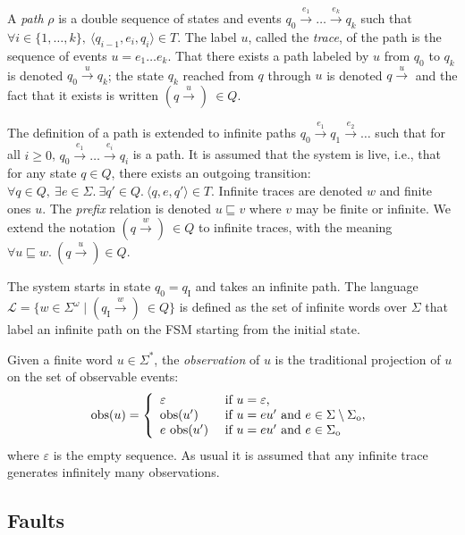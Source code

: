 \documentclass{article}
\newcommand{\prefix}{\sqsubseteq}
\newcommand{\qi}[0]{q_{\mathrm{I}}}
\newcommand{\sigmao}[0]{\Sigma_{\mathrm{o}}}
\newcommand{\Sigmao}[0]{\sigmao}
\newcommand{\path}[0]{\mathit{\rho}}
\newcommand{\trans}[1]{\stackrel{#1}{\rightarrow}}
\newcommand{\lang}[0]{\mathcal{L}}
\newcommand{\obs}[0]{\mathrm{obs}}
\begin{document}
A \emph{path} $\path$ is a double sequence 
of states and events $q_0\trans{e_1}\dots\trans{e_k}q_k$ 
such that $\forall i \in \{1,\dots,k\},\ 
\langle q_{i-1},e_i,q_i\rangle \in T$.  
The label $u$, called the \emph{trace}, of the path 
is the sequence of events $u = e_1\dots e_k$.  
That there exists a path labeled by $u$ from $q_0$ to $q_k$ 
is denoted $q_0 \trans{u} q_k$; 
the state $q_k$ reached from $q$ through $u$ is denoted $q \trans{u}$ 
and the fact that it exists is written $(q \trans{u})\ \in Q$.  

The definition of a path is extended to infinite paths 
$q_0\trans{e_1}q_1\trans{e_2}\dots$ such that for all $i\ge 0$, 
$q_0\trans{e_1}\dots\trans{e_i}q_i$ is a path.  
It is assumed that the system is live, 
i.e., that for any state $q \in Q$, there exists an outgoing transition: 
$\forall q \in Q,\ \exists e \in \Sigma.\ \exists q' \in Q.\ 
\langle q,e,q'\rangle \in T$.  
Infinite traces are denoted $w$ and finite ones $u$.  
The \emph{prefix} relation is denoted $u \prefix v$ 
where $v$ may be finite or infinite.  
We extend the notation $(q \trans{w})\ \in Q$ to infinite traces, 
with the meaning $\forall u \prefix w.\ (q \trans{u}) \in Q$.  

The system starts in state $q_0 = \qi$ 
and takes an infinite path.  
The language $\lang = \{w \in \Sigma^\omega \mid (\qi \trans{w})\ \in Q\}$ 
is defined as the set of infinite words over $\Sigma$ 
that label an infinite path on the FSM starting from the initial state.  

Given a finite word $u \in \Sigma^*$, 
the \emph{observation} of $u$ is the traditional projection 
of $u$ on the set of observable events: 
\begin{displaymath}
\obs(u) = \left\{
\begin{array}{l l}
\varepsilon & \textrm{ if } u = \varepsilon, \\
\obs(u')    & 
\textrm{ if } u = eu' \textrm{ and } e \in \Sigma \setminus \Sigmao, \\
e\ \obs(u')  & 
\textrm{ if } u = eu' \textrm{ and } e \in \Sigmao 
\end{array}
\right.
\end{displaymath}
where $\varepsilon$ is the empty sequence.  
As usual it is assumed that any infinite trace 
generates infinitely many observations.  

\subsection{Faults}
\end{document}
